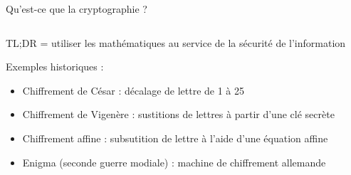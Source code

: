 \begin{frame}{Qu'est-ce que la cryptographie ?}
  \begin{columns}
    \begin{column}{0.65\textwidth}
      TL;DR = utiliser les mathématiques au service de la sécurité de l'information

      Exemples historiques :
      \begin{itemize}
        \item Chiffrement de César : décalage de lettre de 1 à 25
        \item Chiffrement de Vigenère : sustitions de lettres à partir d'une clé secrète
        \item Chiffrement affine : subsutition de lettre à l'aide d'une équation affine
        \item Enigma (seconde guerre modiale) : machine de chiffrement allemande
      \end{itemize}
    \end{column}

    \begin{column}{0.3\textwidth}
      
    \end{column}
  \end{columns}
\end{frame}





